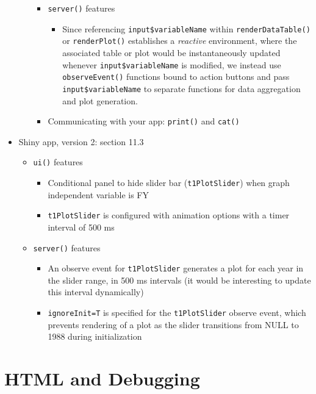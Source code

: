 \documentclass[10pt, letterpaper]{article}
\begin{document}
\begin{spacing}{1.0}
\begin{itemize}
\begin{itemize}
\begin{itemize}
        \item \texttt{server()} features
          \begin{itemize}
            \item Since referencing \texttt{input\$variableName} within \texttt{renderDataTable()} or \texttt{renderPlot()} establishes a \textit{reactive} environment, where the associated table or plot would be instantaneously updated whenever \texttt{input\$variableName} is modified, we instead use \texttt{observeEvent()} functions bound to action buttons and pass \texttt{input\$variableName} to separate functions for data aggregation and plot generation.
          \end{itemize}
        \item Communicating with your app:  \texttt{print()} and \texttt{cat()}
      \end{itemize}
  \end{itemize}
  \item Shiny app, version 2:  section 11.3
    \begin{itemize}
      \item \texttt{ui()} features
        \begin{itemize}
          \item Conditional panel to hide slider bar (\texttt{t1PlotSlider}) when graph independent variable is FY
          \item \texttt{t1PlotSlider} is configured with animation options with a timer interval of 500 ms
        \end{itemize}
      \item \texttt{server()} features
        \begin{itemize}
          \item An observe event for \texttt{t1PlotSlider} generates a plot for each year in the slider range, in 500 ms intervals (it would be interesting to update this interval dynamically) 
          \item \texttt{ignoreInit=T} is specified for the \texttt{t1PlotSlider} observe event, which prevents rendering of a plot as the slider transitions from NULL to 1988 during initialization
        \end{itemize}
    \end{itemize}
\end{itemize}


\section{HTML and Debugging}\label{sec:HTMLdebug}


\end{spacing}
\end{document}
